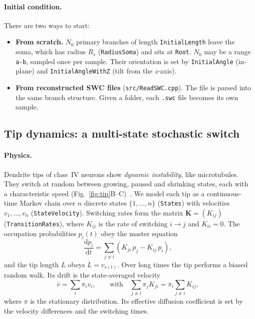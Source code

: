 \documentclass[11pt,a4paper]{article}
\newcommand{\code}[1]{\texttt{#1}}
\newcommand{\dd}{\mathrm{d}}
\begin{document}
\paragraph{Initial condition.}
There are two ways to start:
\begin{itemize}
  \item \textbf{From scratch.} $N_0$ primary branches of length \code{InitialLength} leave the soma, which has radius $R_s$ (\code{RadiusSoma}) and sits at \code{Root}. $N_0$ may be a range \code{a-b}, sampled once per sample. Their orientation is set by \code{InitialAngle} (in-plane) and \code{InitialAngleWithZ} (tilt from the $z$-axis).
  \item \textbf{From reconstructed SWC files} (\code{src/ReadSWC.cpp}). The file is parsed into the same branch structure. Given a folder, each \code{.swc} file becomes its own sample.
\end{itemize}

\FloatBarrier
\subsection{Tip dynamics: a multi-state stochastic switch}\label{sec:tip}
\paragraph{Physics.}
Dendrite tips of class~IV neurons show \emph{dynamic instability}, like microtubules. They switch at random between growing, paused and shrinking states, each with a characteristic speed (Fig.~\ref{fig:tip}B--C)~\cite{Shree2022}. We model each tip as a continuous-time Markov chain over $n$ discrete states $\{1,\dots,n\}$ (\code{States}) with velocities $v_1,\dots,v_n$ (\code{StateVelocity}). Switching rates form the matrix $\mathbf K=(K_{ij})$ (\code{TransitionRates}), where $K_{ij}$ is the rate of switching $i\to j$ and $K_{ii}=0$. The occupation probabilities $p_i(t)$ obey the master equation
\begin{equation}
  \frac{\dd p_i}{\dd t}=\sum_{j\neq i}\left(K_{ji}\,p_j-K_{ij}\,p_i\right),
\end{equation}
and the tip length $L$ obeys $\dot L=v_{s(t)}$. Over long times the tip performs a biased random walk. Its drift is the state-averaged velocity
\begin{equation}
  \bar v=\sum_i \pi_i v_i ,\qquad \text{with}\quad \sum_{j\ne i}\pi_j K_{ji}=\pi_i\sum_{j\ne i}K_{ij},
\end{equation}
where $\pi$ is the stationary distribution. Its effective diffusion coefficient is set by the velocity differences and the switching times.
\end{document}

